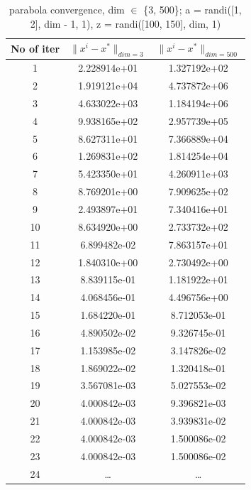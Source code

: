 \documentclass{article}
\begin{document}
\begin{table}[H]
    \centering
    \caption{parabola convergence, dim \(\in\) \{3, 500\}; a = randi([1, 2], dim - 1, 1), z = randi([100, 150], dim, 1)}
    \begin{tabular}{c|c|c}
        No of iter & \(\| x^i - x^*  \|_{dim = 3}\) & \(\| x^i - x^*  \|_{dim = 500}\) \\
        \hline
        1 & 2.228914e+01 & 1.327192e+02 \\
        2 & 1.919121e+04 & 4.737872e+06 \\
        3 & 4.633022e+03 & 1.184194e+06 \\
        4 & 9.938165e+02 & 2.957739e+05 \\
        5 & 8.627311e+01 & 7.366889e+04 \\
        6 & 1.269831e+02 & 1.814254e+04 \\
        7 & 5.423350e+01 & 4.260911e+03 \\
        8 & 8.769201e+00 & 7.909625e+02 \\
        9 & 2.493897e+01 & 7.340416e+01 \\
        10 & 8.634920e+00 & 2.733732e+02\\
        11 & 6.899482e-02 & 7.863157e+01\\
        12 & 1.840310e+00 & 2.730492e+00\\
        13 & 8.839115e-01 & 1.181922e+01\\
        14 & 4.068456e-01 & 4.496756e+00\\
        15 & 1.684220e-01 & 8.712053e-01\\ 
        16 & 4.890502e-02 & 9.326745e-01\\ 
        17 & 1.153985e-02 & 3.147826e-02\\ 
        18 & 1.869022e-02 & 1.320418e-01\\
        19 & 3.567081e-03 & 5.027553e-02\\
        20 & 4.000842e-03 & 9.396821e-03\\
        21 & 4.000842e-03 & 3.939831e-02\\
        22 & 4.000842e-03 & 1.500086e-02\\
        23 & 4.000842e-03 & 1.500086e-02\\
        24 & \dots & \dots \\
    \end{tabular}
    \label{tab:my_label2}
\end{table}
\end{document}

